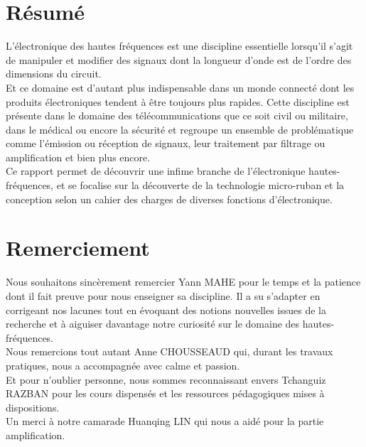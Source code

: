 \documentclass[french]{article}
\begin{document}
\newpage

\tableofcontents
\newpage
\listoffigures
\listoftables
\newpage


\vspace*{4cm}
\section*{Résumé}
L'électronique des hautes fréquences est une discipline essentielle lorsqu'il s'agit de manipuler et modifier des signaux dont la longueur d'onde est de l'ordre des dimensions du circuit.\\
Et ce domaine est d'autant plus indispensable dans un monde connecté dont les produits électroniques tendent à être toujours plus rapides. Cette discipline est présente dans le domaine des télécommunications que ce soit civil ou militaire, dans le médical ou encore la sécurité et regroupe un ensemble de problématique comme l'émission ou réception de signaux, leur traitement par filtrage ou amplification et bien plus encore.\\
Ce rapport permet de découvrir une infime branche de l'électronique hautes-fréquences, et se focalise sur la découverte de la technologie micro-ruban et la conception selon un cahier des charges de diverses fonctions d'électronique.

\vspace{1cm}

\section*{Remerciement}
Nous souhaitons sincèrement remercier Yann MAHE pour le temps et la patience dont il fait preuve pour nous enseigner sa discipline. Il a su s'adapter en corrigeant nos lacunes tout en évoquant des notions nouvelles issues de la recherche et à aiguiser davantage notre curiosité sur le domaine des hautes-fréquences.\\
Nous remercions tout autant Anne CHOUSSEAUD qui, durant les travaux pratiques, nous a accompagnée avec calme et passion.\\
Et pour n'oublier personne, nous sommes reconnaissant envers Tchanguiz RAZBAN pour les cours dispensés et les ressources pédagogiques mises à dispositions.\\
Un merci à notre camarade Huanqing LIN qui nous a aidé pour la partie amplification.

\newpage
\pagestyle{plain} %
\end{document}
